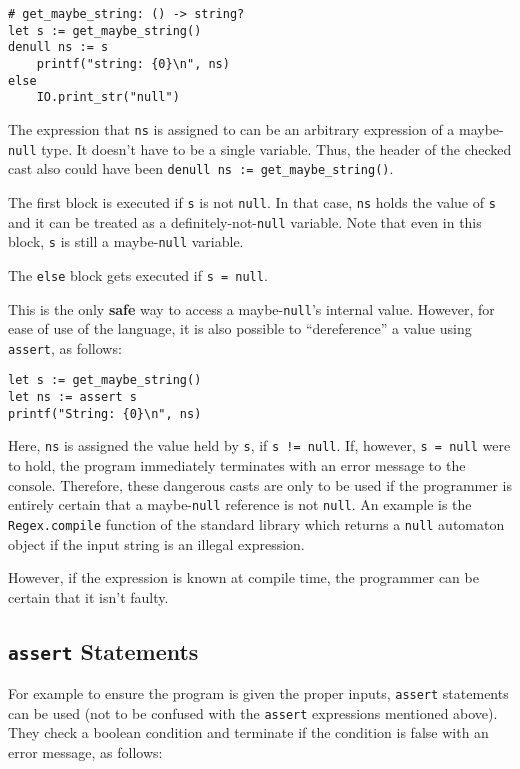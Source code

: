 \documentclass{article}
\newcommand{\code}[1]{\lstinline[columns=fixed]{#1}}
\begin{document}
			\begin{lstlisting}
# get_maybe_string: () -> string?
let s := get_maybe_string()
denull ns := s
	printf("string: {0}\n", ns)
else
	IO.print_str("null")
			\end{lstlisting}
			
			The expression that \code{ns} is assigned to can be an arbitrary expression of a maybe-\code{null} type. It doesn't have to be a single variable. Thus, the header of the checked cast also could have been \code{denull ns := get_maybe_string()}.
			
			The first block is executed if \code{s} is not \code{null}. In that case, \code{ns} holds the value of \code{s} and it can be treated as a definitely-not-\code{null} variable. Note that even in this block, \code{s} is still a maybe-\code{null} variable.
			
			The \code{else} block gets executed if \code{s = null}.
			
			This is the only \textbf{safe} way to access a maybe-\code{null}'s internal value. However, for ease of use of the language, it is also possible to ``dereference'' a value using \code{assert}, as follows:
			
			\begin{lstlisting}
let s := get_maybe_string()
let ns := assert s
printf("String: {0}\n", ns)
			\end{lstlisting}
			
			Here, \code{ns} is assigned the value held by \code{s}, if \code{s != null}. If, however, \code{s = null} were to hold, the program immediately terminates with an error message to the console. Therefore, these dangerous casts are only to be used if the programmer is entirely certain that a maybe-\code{null} reference is not \code{null}. An example is the \code{Regex.compile} function of the standard library which returns a \code{null} automaton object if the input string is an illegal expression.
			
			However, if the expression is known at compile time, the programmer can be certain that it isn't faulty.
			
			\subsection{\code{assert} Statements}
			
				For example to ensure the program is given the proper inputs, \code{assert} statements can be used (not to be confused with the \code{assert} expressions mentioned above). They check a boolean condition and terminate if the condition is false with an error message, as follows:
				
\end{document}
